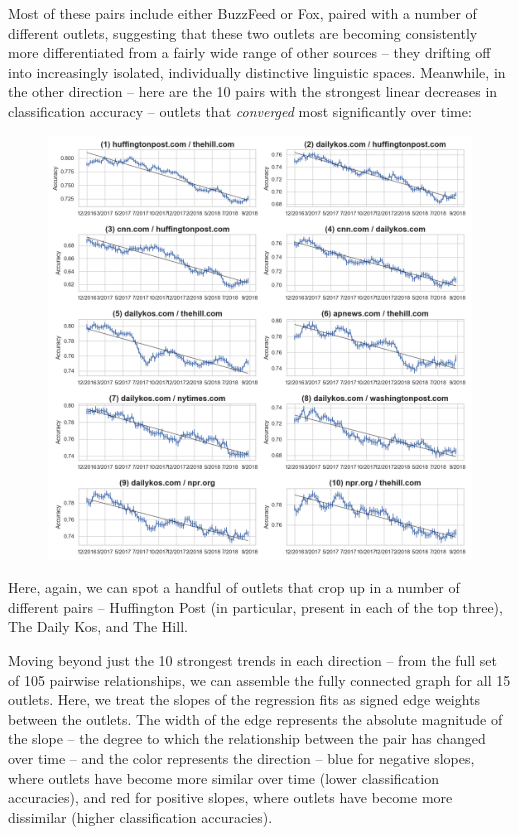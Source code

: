 \documentclass{scrartcl}
\begin{document}
Most of these pairs include either BuzzFeed or Fox, paired with a number of different outlets, suggesting that these two outlets are becoming consistently more differentiated from a fairly wide range of other sources -- they drifting off into increasingly isolated, individually distinctive linguistic spaces. Meanwhile, in the other direction -- here are the 10 pairs with the strongest linear decreases in classification accuracy -- outlets that \textit{converged} most significantly over time:

\begin{figure}[H]
  \centering
  \includegraphics[height=\textheight]{figures/ts-ab-falling.png}
\end{figure}

Here, again, we can spot a handful of outlets that crop up in a number of different pairs -- Huffington Post (in particular, present in each of the top three), The Daily Kos, and The Hill.

Moving beyond just the 10 strongest trends in each direction -- from the full set of 105 pairwise relationships, we can assemble the fully connected graph for all 15 outlets. Here, we treat the slopes of the regression fits as signed edge weights between the outlets. The width of the edge represents the absolute magnitude of the slope -- the degree to which the relationship between the pair has changed over time -- and the color represents the direction -- blue for negative slopes, where outlets have become more similar over time (lower classification accuracies), and red for positive slopes, where outlets have become more dissimilar (higher classification accuracies).
\end{document}

